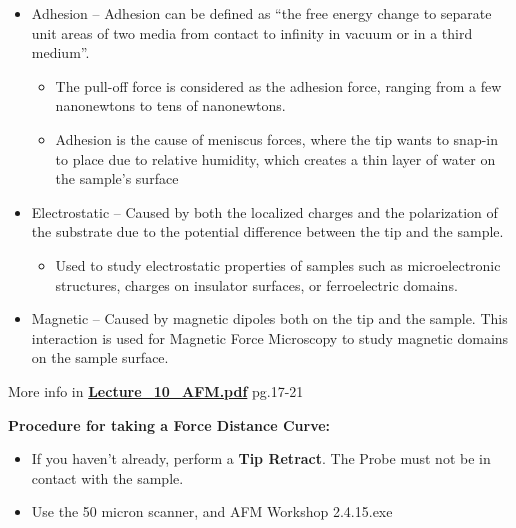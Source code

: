 \documentclass{../lab}
\begin{document}
{\begin{itemize}
        \item Adhesion – Adhesion can be defined as ``the free energy change to separate unit areas of two media from contact to infinity in vacuum or in a third medium''.

        \begin{itemize}
            \item The pull-off force is considered as the adhesion force, ranging from a few nanonewtons to tens of nanonewtons.

            \item Adhesion is the cause of meniscus forces, where the tip wants to snap-in to place due to relative humidity, which creates a thin layer of water on the sample’s surface

        \end{itemize}

        \item Electrostatic – Caused by both the localized charges and the polarization of the substrate due to the potential difference between the tip and the sample.

        \begin{itemize}
            \item Used to study electrostatic properties of samples such as microelectronic structures, charges on insulator surfaces, or ferroelectric domains.

        \end{itemize}

        \item Magnetic – Caused by magnetic dipoles both on the tip and the sample. This interaction is used for Magnetic Force Microscopy to study magnetic domains on the sample surface.

    \end{itemize}

More info in\textbf{ }\href{http://experimentationlab.berkeley.edu/sites/default/files/AFMImages/Lecture\_10\_AFM.pdf}{\textbf{Lecture\_10\_AFM.pdf}}\textbf{ } pg.17-21

\textbf{}

\textbf{Procedure for taking a Force Distance Curve:}

    \begin{itemize}
        \item If you haven’t already, perform a \textbf{Tip Retract}.  The Probe must not be in contact with the sample.

        \item Use the 50 micron scanner, and AFM Workshop 2.4.15.exe


\end{itemize}}
\end{document}
